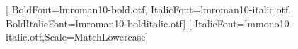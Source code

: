 \usepackage{fontspec}
\setmainfont{lmroman10-regular.otf}[
  BoldFont=lmroman10-bold.otf,
  ItalicFont=lmroman10-italic.otf,
  BoldItalicFont=lmroman10-bolditalic.otf]
\setmonofont{lmmono10-regular.otf}[
  ItalicFont=lmmono10-italic.otf,Scale=MatchLowercase]

\usepackage{booktabs}
\usepackage{array}
\usepackage[table]{xcolor}
\usepackage{microtype}
\usepackage{amsmath}
\usepackage[hidelinks]{hyperref}

\renewcommand{\arraystretch}{1.15}
\setlength{\tabcolsep}{5pt}


\usepackage{etoolbox}
\usepackage{framed}
\renewenvironment{quote}{\begin{shaded}\small}{\end{shaded}}

\usepackage{titlesec}
\titleformat{\section}{\large\bfseries}{\thesection}{0.6em}{}
\titleformat{\subsection}{\normalsize\bfseries}{\thesubsection}{0.6em}{}

\usepackage{caption}
\captionsetup{font=small,labelfont=bf}
\usepackage{float}
